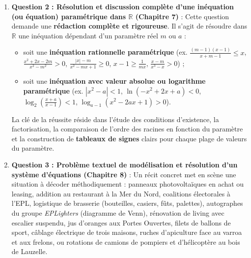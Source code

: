 \documentclass[11pt,a4paper,oneside]{book}
\newcommand{\R}{\mathbb{R}}
\begin{document}
\begin{enumerate}
\begin{itemize}
        \item \textbf{Analyse combinatoire et probabilités (Chapitre 5) :} dénombrement avec contraintes (livret recto-verso, cadenas, choix de livres ou de questions d'examen) et calcul de probabilités sous forme de fraction irréductible (lancers de dés : full, paire ; tirages de cartes, d'urnes ou de chaussettes ; files d'attente).
        \item \textbf{Suites arithmétiques et géométriques (Chapitre 6) :} calcul du premier terme $u_1$, de la raison ou du nombre de termes à partir de la somme $S_n$ (collection de pierres, soirée chantante, échelle de menuisier, tronçons de corde, prix d'un concours).
    \end{itemize}
    \item \textbf{Question 2 : Résolution et discussion complète d'une inéquation (ou équation) paramétrique dans $\R$ (Chapitre 7)} :
    Cette question demande une \textbf{rédaction complète et rigoureuse}. Il s'agit de résoudre dans $\R$ une inéquation dépendant d'un paramètre réel $m$ ou $a$ :
    \begin{itemize}
        \item soit une \textbf{inéquation rationnelle paramétrique} (ex. $\frac{(m-1)(x-1)}{x+m-1} \le x$, $\frac{x^2+2x-2m}{x^2-m^2} > 0$, $\frac{|x|-m}{x^2-mx+1} \ge 0$, $x-1 \ge \frac{1}{mx}$, $\frac{x-m}{x^3-x} > 0$) ;
        \item soit une \textbf{inéquation avec valeur absolue ou logarithme paramétrique} (ex. $|x^2-a| < 1$, $\ln(-x^2+2x+a) < 0$, $\log_2\left(\frac{x+a}{x-1}\right) < 1$, $\log_{a-1}(x^2-2ax+1) > 0$).
    \end{itemize}
    La clé de la réussite réside dans l'étude des conditions d'existence, la factorisation, la comparaison de l'ordre des racines en fonction du paramètre et la construction de \textbf{tableaux de signes} clairs pour chaque plage de valeurs du paramètre.
    \item \textbf{Question 3 : Problème textuel de modélisation et résolution d'un système d'équations (Chapitre 8)} :
    Un récit concret met en scène une situation à décoder méthodiquement : panneaux photovoltaïques en achat ou leasing, addition au restaurant à la Mer du Nord, coalitions électorales à l'EPL, logistique de brasserie (bouteilles, casiers, fûts, palettes), autographes du groupe \emph{EPLighters} (diagramme de Venn), rénovation de living avec escalier suspendu, jus d'oranges aux Portes Ouvertes, filets de ballons de sport, câblage électrique de trois maisons, ruches d'apiculture face au varroa et aux frelons, ou rotations de camions de pompiers et d'hélicoptère au bois de Lauzelle.
\end{enumerate}
\end{document}

